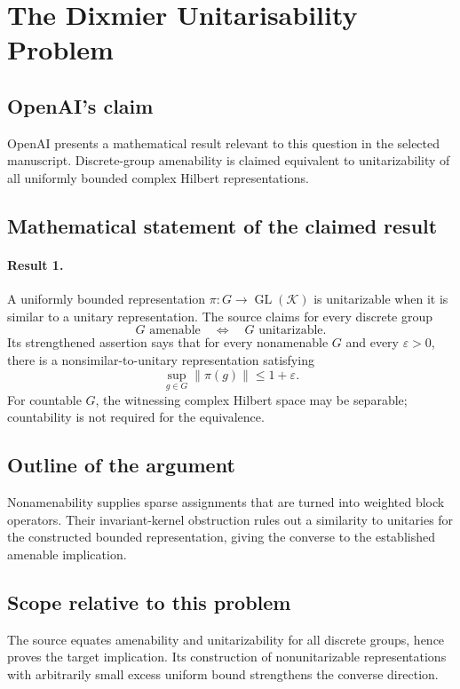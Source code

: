 \documentclass[11pt]{article}
\begin{document}
\section*{The Dixmier Unitarisability Problem}

\subsection{OpenAI's claim}
OpenAI presents a mathematical result relevant to this question in the selected manuscript. Discrete-group amenability is claimed equivalent to unitarizability of all uniformly bounded complex Hilbert representations.

\subsection{Mathematical statement of the claimed result}
\paragraph{Result 1.} A uniformly bounded representation \(\pi:G\to\operatorname{GL}(\mathcal K)\) is unitarizable when it is similar to a unitary representation. The source claims for every discrete group
\[
 G\text{ amenable}\quad\Longleftrightarrow\quad G\text{ unitarizable}.
\]
Its strengthened assertion says that for every nonamenable \(G\) and every \(\varepsilon>0\), there is a nonsimilar-to-unitary representation satisfying
\[
 \sup_{g\in G}\|\pi(g)\|\le1+\varepsilon.
\]
For countable \(G\), the witnessing complex Hilbert space may be separable; countability is not required for the equivalence.

\subsection{Outline of the argument}
Nonamenability supplies sparse assignments that are turned into weighted block operators. Their invariant-kernel obstruction rules out a similarity to unitaries for the constructed bounded representation, giving the converse to the established amenable implication.

\subsection{Scope relative to this problem}
The source equates amenability and unitarizability for all discrete groups, hence proves the target implication. Its construction of nonunitarizable representations with arbitrarily small excess uniform bound strengthens the converse direction.
\end{document}
